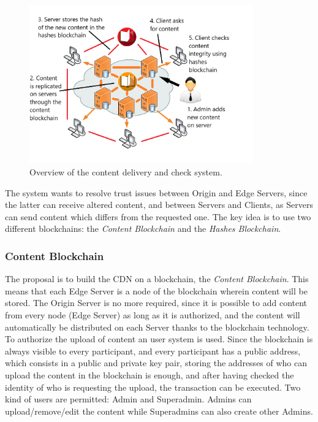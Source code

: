 \documentclass[conference,compsoc]{IEEEtran}
\begin{document}
\begin{figure}[!h]
	\centering
	\includegraphics[width=3.8in]{images/SystemOverview.png}
	
	\caption{Overview of the content delivery and check system.}
	\label{fig:SystemOverview}
\end{figure} 

The system wants to resolve trust issues between Origin and Edge Servers, since the latter can receive altered content, and between Servers and Clients, as Servers can send content which differs from the requested one. The key idea is to use two different blockchains: the \textit{Content Blockchain} and the \textit{Hashes Blockchain}.
\subsubsection{Content Blockchain}
The proposal is to build the CDN on a blockchain, the \textit{Content Blockchain}. This means that each Edge Server is a node of the blockchain wherein content will be stored. The Origin Server is no more required, since it is possible to add content from every node (Edge Server) as long as it is authorized, and the content will automatically be distributed on each Server thanks to the blockchain technology. To authorize the upload of content an user system is used. Since the blockchain is always visible to every participant, and every participant has a public address, which consists in a public and private key pair, storing the addresses of who can upload the content in the blockchain is enough, and after having checked the identity of who is requesting the upload, the transaction can be executed. Two kind of users are permitted: Admin and Superadmin. Admins can upload/remove/edit the content while Superadmins can also create other Admins. 
\end{document}
